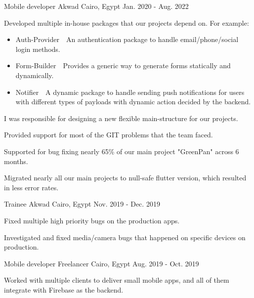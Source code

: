 \begin{cventries}
  \cventry
    {Mobile developer} %
    {Akwad} %
    {Cairo, Egypt} %
    {Jan. 2020 - Aug. 2022} %
    {
      \begin{cvitems} %
        \item {Developed multiple in-house packages that our projects depend on. For example:}
        \begin{itemize}
          \item {Auth-Provider~\rightarrow~An authentication package to handle email/phone/social login methods.}
          \item {Form-Builder~\rightarrow~Provides a generic way to generate forms statically and dynamically.}
          \item {Notifier~\rightarrow~A dynamic package to handle sending push notifications for users with different types of payloads with dynamic action decided by the backend.}
        \end{itemize}
        \item {I was responsible for designing a new flexible main-structure for our projects.}
        \item {Provided support for most of the GIT problems that the team faced.}
        \item {Supported for bug fixing nearly 65\% of our main project "GreenPan" across 6 months.}
        \item {Migrated nearly all our main projects to null-safe flutter version, which resulted in less error rates.}
      \end{cvitems}
    }

  \cventry
    {Trainee} %
    {Akwad} %
    {Cairo, Egypt} %
    {Nov. 2019 - Dec. 2019} %
    {
      \begin{cvitems}
        \item {Fixed multiple high priority bugs on the production apps.}
        \item {Investigated and fixed media/camera bugs that happened on specific devices on production.}
      \end{cvitems}
    }

  \cventry
    {Mobile developer} %
    {Freelancer} %
    {Cairo, Egypt} %
    {Aug. 2019 - Oct. 2019} %
    {
      \begin{cvitems}
        Worked with multiple clients to deliver small mobile apps, and all of them integrate with Firebase as the backend.
      \end{cvitems}
    }

\end{cventries}
  